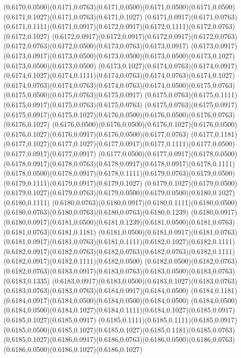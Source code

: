 (0.6170,0.0500)(0.6171,0.0763)(0.6171,0.0500)(0.6171,0.0500)(0.6171,0.0500)(0.6171,0.1027)(0.6171,0.0763)(0.6171,0.1027)
(0.6171,0.0917)(0.6171,0.0763)(0.6171,0.1111)(0.6171,0.0917)(0.6172,0.0917)(0.6172,0.1111)(0.6172,0.0763)(0.6172,0.1027)
(0.6172,0.0917)(0.6172,0.0917)(0.6172,0.0917)(0.6172,0.0763)(0.6172,0.0763)(0.6172,0.0500)(0.6173,0.0763)(0.6173,0.0917)
(0.6173,0.0917)(0.6173,0.0917)(0.6173,0.0500)(0.6173,0.0500)(0.6173,0.0500)(0.6173,0.1027)(0.6173,0.0500)(0.6173,0.0500)
(0.6173,0.1027)(0.6174,0.0763)(0.6174,0.0917)(0.6174,0.1027)(0.6174,0.1111)(0.6174,0.0763)(0.6174,0.0763)(0.6174,0.1027)
(0.6174,0.0763)(0.6174,0.0763)(0.6174,0.0763)(0.6174,0.0500)(0.6175,0.0763)(0.6175,0.0500)(0.6175,0.0763)(0.6175,0.0917)
(0.6175,0.0763)(0.6175,0.1111)(0.6175,0.0917)(0.6175,0.0763)(0.6175,0.0763)
\PST@Solid(0.6175,0.0763)(0.6175,0.0917)(0.6175,0.0917)(0.6175,0.1027)(0.6176,0.0500)(0.6176,0.0500)(0.6176,0.0763)(0.6176,0.1027)
(0.6176,0.0500)(0.6176,0.0500)(0.6176,0.1027)(0.6176,0.0500)(0.6176,0.1027)(0.6176,0.0917)(0.6176,0.0500)(0.6177,0.0763)
(0.6177,0.1181)(0.6177,0.1027)(0.6177,0.1027)(0.6177,0.0917)(0.6177,0.1111)(0.6177,0.0500)(0.6177,0.0917)(0.6177,0.0917)
(0.6177,0.0500)(0.6177,0.0917)(0.6178,0.0500)(0.6178,0.0917)(0.6178,0.0763)(0.6178,0.0917)(0.6178,0.0917)(0.6178,0.1111)
(0.6178,0.0500)(0.6178,0.0917)(0.6178,0.1111)(0.6179,0.0763)(0.6179,0.0500)(0.6179,0.1111)(0.6179,0.0917)(0.6179,0.1027)
(0.6179,0.1027)(0.6179,0.0500)(0.6179,0.1027)(0.6179,0.0763)(0.6179,0.0500)(0.6179,0.0500)(0.6180,0.1027)(0.6180,0.1111)
(0.6180,0.0763)(0.6180,0.0917)(0.6180,0.1111)(0.6180,0.0500)(0.6180,0.0763)(0.6180,0.0763)(0.6180,0.0763)(0.6180,0.1239)
(0.6180,0.0917)(0.6180,0.0917)(0.6181,0.0500)(0.6181,0.1239)(0.6181,0.0500)(0.6181,0.0763)(0.6181,0.0763)(0.6181,0.1181)
(0.6181,0.0500)(0.6181,0.0917)(0.6181,0.0763)(0.6181,0.0917)(0.6181,0.0763)(0.6181,0.1111)(0.6182,0.1027)(0.6182,0.1111)
(0.6182,0.0917)(0.6182,0.0763)(0.6182,0.0763)(0.6182,0.0763)(0.6182,0.1111)(0.6182,0.0917)(0.6182,0.1111)(0.6182,0.0500)
(0.6182,0.0500)(0.6182,0.0763)(0.6182,0.0763)(0.6183,0.0917)(0.6183,0.0763)(0.6183,0.0500)(0.6183,0.0763)(0.6183,0.1335)
(0.6183,0.0917)(0.6183,0.0500)(0.6183,0.1027)(0.6183,0.0763)(0.6183,0.0763)(0.6183,0.0763)(0.6184,0.0917)(0.6184,0.0500)
(0.6184,0.1181)(0.6184,0.0917)(0.6184,0.0500)(0.6184,0.0500)(0.6184,0.0500)
\PST@Solid(0.6184,0.0500)(0.6184,0.0500)(0.6184,0.1027)(0.6184,0.1111)(0.6184,0.1027)(0.6185,0.0917)(0.6185,0.1027)(0.6185,0.0917)
(0.6185,0.1111)(0.6185,0.1111)(0.6185,0.0917)(0.6185,0.0500)(0.6185,0.1027)(0.6185,0.1027)(0.6185,0.1181)(0.6185,0.0763)
(0.6185,0.1027)(0.6186,0.0917)(0.6186,0.0763)(0.6186,0.0500)(0.6186,0.0763)(0.6186,0.0500)(0.6186,0.1027)(0.6186,0.1027)
